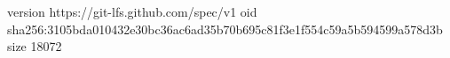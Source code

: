 version https://git-lfs.github.com/spec/v1
oid sha256:3105bda010432e30bc36ac6ad35b70b695c81f3e1f554c59a5b594599a578d3b
size 18072
